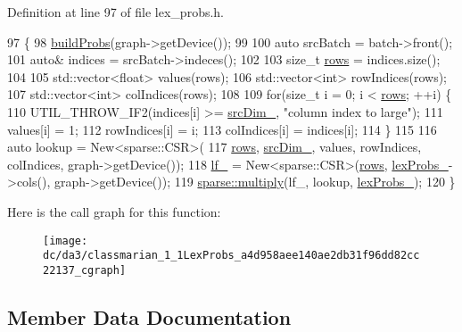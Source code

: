 Definition at line 97 of file lex\+\_\+probs.\+h.


\begin{DoxyCode}
97                                                                        \{
98     \hyperlink{classmarian_1_1LexProbs_aace10e92c706a3ddc6706fc8bb91b97b}{buildProbs}(graph->getDevice());
99 
100     \textcolor{keyword}{auto} srcBatch = batch->front();
101     \textcolor{keyword}{auto}& indices = srcBatch->indeces();
102 
103     \textcolor{keywordtype}{size\_t} \hyperlink{namespacemarian_ace1e9a63d52edc363d70d661cf8d0257}{rows} = indices.size();
104 
105     std::vector<float> values(rows);
106     std::vector<int> rowIndices(rows);
107     std::vector<int> colIndices(rows);
108 
109     \textcolor{keywordflow}{for}(\textcolor{keywordtype}{size\_t} i = 0; i < \hyperlink{namespacemarian_ace1e9a63d52edc363d70d661cf8d0257}{rows}; ++i) \{
110       UTIL\_THROW\_IF2(indices[i] >= \hyperlink{classmarian_1_1LexProbs_a066f91b5a18aa4e703d36b2e5583a1d5}{srcDim\_}, \textcolor{stringliteral}{"column index to large"});
111       values[i] = 1;
112       rowIndices[i] = i;
113       colIndices[i] = indices[i];
114     \}
115 
116     \textcolor{keyword}{auto} lookup = New<sparse::CSR>(
117         \hyperlink{namespacemarian_ace1e9a63d52edc363d70d661cf8d0257}{rows}, \hyperlink{classmarian_1_1LexProbs_a066f91b5a18aa4e703d36b2e5583a1d5}{srcDim\_}, values, rowIndices, colIndices, graph->getDevice());
118     \hyperlink{classmarian_1_1LexProbs_a65bfae71dcdadf29398ab31ab855065c}{lf\_} = New<sparse::CSR>(\hyperlink{namespacemarian_ace1e9a63d52edc363d70d661cf8d0257}{rows}, \hyperlink{classmarian_1_1LexProbs_a58752d3501db781924b464b19d0d3af2}{lexProbs\_}->cols(), graph->getDevice());
119     \hyperlink{namespacemarian_1_1sparse_ad5213500007ccc462473804a1374c1ff}{sparse::multiply}(lf\_, lookup, \hyperlink{classmarian_1_1LexProbs_a58752d3501db781924b464b19d0d3af2}{lexProbs\_});
120   \}
\end{DoxyCode}


Here is the call graph for this function\+:
\nopagebreak
\begin{figure}[H]
\begin{center}
\leavevmode
\texttt{[image: dc/da3/classmarian\_1\_1LexProbs\_a4d958aee140ae2db31f96dd82cc22137\_cgraph]}
\end{center}
\end{figure}




\subsection{Member Data Documentation}
